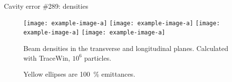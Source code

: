 \begin{frame}[t]
\begin{columns}[t]
\begin{column}{\colwidth}
         \begin{block}{Cavity error \#289: densities}
            \begin{figure}
               \centering
               \texttt{[image: example-image-a]}
               \texttt{[image: example-image-a]}
               \texttt{[image: example-image-a]}
               \texttt{[image: example-image-a]}
               \caption{%
                  Beam densities in the transverse and longitudinal planes.
                  Calculated with TraceWin, \( 10^6 \) particles.
               }
            \end{figure}

            \begin{figure}[hbtp]
               \caption{%
                  Yellow ellipses are \SI{100}{\percent} emittances.
               }
               \label{fig:emittance}
            \end{figure}
         \end{block}


\end{column}
\end{columns}
\end{frame}
